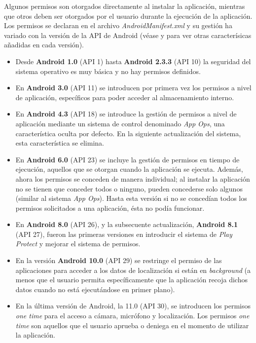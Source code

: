 Algunos permisos son otorgados directamente al instalar la aplicación, mientras que otros deben ser otorgados por el usuario durante la ejecución de la aplicación. Los permisos se declaran en el archivo \textit{AndroidManifest.xml} y su gestión ha variado con la versión de la API de Android (véase\hypersetup{citecolor=red}\cite{history} y\hypersetup{citecolor=red}\cite{sharma} para ver otras caracterísicas añadidas en cada versión). 

\begin{itemize}
	\item Desde \textbf{Android 1.0} (API 1) hasta \textbf{Android 2.3.3} (API 10) la seguridad del sistema operativo es muy básica y no hay permisos definidos.
	\item En \textbf{Android 3.0} (API 11) se introducen por primera vez los permisos a nivel de aplicación, específicos para poder acceder al almacenamiento interno.
	\item En \textbf{Android 4.3} (API 18) se introduce la gestión de permisos a nivel de aplicación mediante un sistema de control denominado \textit{App Ops}, una característica oculta por defecto. En la siguiente actualización del sistema, esta característica se elimina.
	\item En \textbf{Android 6.0} (API 23) se incluye la gestión de permisos en tiempo de ejecución, aquellos que se otorgan cuando la aplicación se ejecuta. Además, ahora los permisos se conceden de manera individual; al instalar la aplicación no se tienen que conceder todos o ninguno, pueden concederse solo algunos (similar al sistema \textit{App Ops}). Hasta esta versión si no se concedían todos los permisos solicitados a una aplicación, ésta no podía funcionar.
	\item En \textbf{Android 8.0} (API 26), y la subsecuente actualización, \textbf{Android 8.1} (API 27), fueron las primeras versiones en introducir el sistema de \textit{Play Protect} y mejorar el sistema de permisos.
	\item En la versión \textbf{Android 10.0} (API 29) se restringe el permiso de las aplicaciones para acceder a los datos de localización si están en \textit{background} (a menos que el usuario permita específicamente que la aplicación recoja dichos datos cuando no está ejecutándose en primer plano).
	\item En la última versión de Android, la 11.0 (API 30), se introducen los permisos \textit{one time} para el acceso a cámara, micrófono y localización. Los permisos \textit{one time} son aquellos que el usuario aprueba o deniega en el momento de utilizar la aplicación.
\end{itemize}

